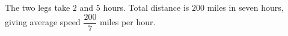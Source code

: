 The two legs take $2$ and $5$ hours. Total distance is $200$ miles in seven hours, giving average speed $\boxed{\dfrac{200}{7}}$ miles per hour.
